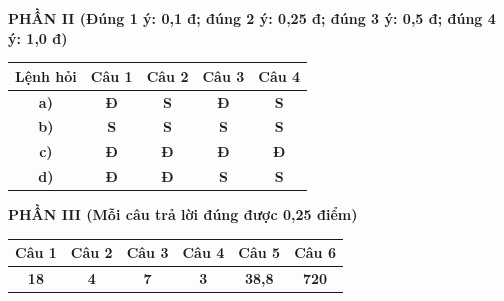 \documentclass[11pt,a4paper]{article}
\begin{document}
\vspace{0.2cm}
\noindent\textbf{\color{mainGreen}PHẦN II (Đúng 1 ý: 0,1 đ; đúng 2 ý: 0,25 đ; đúng 3 ý: 0,5 đ; đúng 4 ý: 1,0 đ)}
\begin{center}
\renewcommand{\arraystretch}{1.2}
\begin{tabular}{|c|c|c|c|c|}
\hline
\textbf{Lệnh hỏi} & \textbf{Câu 1} & \textbf{Câu 2} & \textbf{Câu 3} & \textbf{Câu 4} \\
\hline
\textbf{a)} & \textbf{\color{hfRed}Đ} & \textbf{S} & \textbf{\color{hfRed}Đ} & \textbf{S} \\
\hline
\textbf{b)} & \textbf{S} & \textbf{S} & \textbf{S} & \textbf{S} \\
\hline
\textbf{c)} & \textbf{\color{hfRed}Đ} & \textbf{\color{hfRed}Đ} & \textbf{\color{hfRed}Đ} & \textbf{\color{hfRed}Đ} \\
\hline
\textbf{d)} & \textbf{\color{hfRed}Đ} & \textbf{\color{hfRed}Đ} & \textbf{S} & \textbf{S} \\
\hline
\end{tabular}
\end{center}

\vspace{0.2cm}
\noindent\textbf{\color{mainGreen}PHẦN III (Mỗi câu trả lời đúng được 0,25 điểm)}
\begin{center}
\renewcommand{\arraystretch}{1.2}
\begin{tabular}{|c|c|c|c|c|c|}
\hline
\textbf{Câu 1} & \textbf{Câu 2} & \textbf{Câu 3} & \textbf{Câu 4} & \textbf{Câu 5} & \textbf{Câu 6} \\
\hline
\textbf{\color{hfRed}18} & \textbf{\color{hfRed}4} & \textbf{\color{hfRed}7} & \textbf{\color{hfRed}3} & \textbf{\color{hfRed}38,8} & \textbf{\color{hfRed}720} \\
\hline
\end{tabular}
\end{center}
\end{document}
